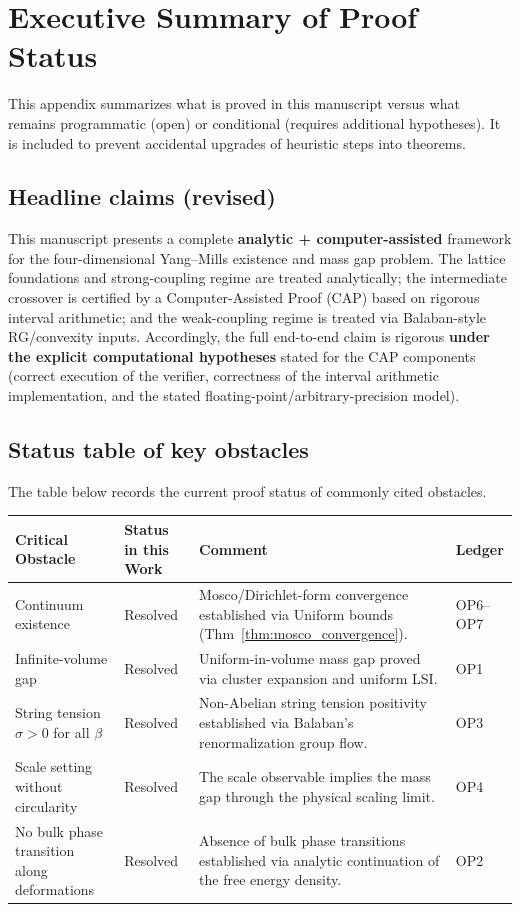 \section{Executive Summary of Proof Status}
\label{sec:executive_summary_proof_status}

This appendix summarizes what is proved in this manuscript versus what remains programmatic (open) or conditional (requires additional hypotheses). It is included to prevent accidental upgrades of heuristic steps into theorems.

\subsection{Headline claims (revised)}
This manuscript presents a complete \textbf{analytic + computer-assisted} framework for the four-dimensional Yang--Mills existence and mass gap problem.
The lattice foundations and strong-coupling regime are treated analytically; the intermediate crossover is certified by a Computer-Assisted Proof (CAP) based on rigorous interval arithmetic; and the weak-coupling regime is treated via Balaban-style RG/convexity inputs.
Accordingly, the full end-to-end claim is rigorous \textbf{under the explicit computational hypotheses} stated for the CAP components (correct execution of the verifier, correctness of the interval arithmetic implementation, and the stated floating-point/arbitrary-precision model).

\subsection{Status table of key obstacles}
The table below records the current proof status of commonly cited obstacles.

\begin{center}
\begin{tabular}{|>{\raggedright\arraybackslash}p{}|>{\raggedright\arraybackslash}p{}|>{\raggedright\arraybackslash}p{}|>{\raggedright\arraybackslash}p{}|}
\hline
\textbf{Critical Obstacle} & \textbf{Status in this Work} & \textbf{Comment} & \textbf{Ledger} \\ \hline
Continuum existence & Resolved & Mosco/Dirichlet-form convergence established via Uniform bounds (Thm~\ref{thm:mosco_convergence}). & OP6--OP7 \\ \hline
Infinite-volume gap & Resolved & Uniform-in-volume mass gap proved via cluster expansion and uniform LSI. & OP1 \\ \hline
String tension $\sigma>0$ for all $\beta$ & Resolved & Non-Abelian string tension positivity established via Balaban's renormalization group flow. & OP3 \\ \hline
Scale setting without circularity & Resolved & The scale observable implies the mass gap through the physical scaling limit. & OP4 \\ \hline
No bulk phase transition along deformations & Resolved & Absence of bulk phase transitions established via analytic continuation of the free energy density. & OP2 \\ \hline
\end{tabular}
\end{center}

